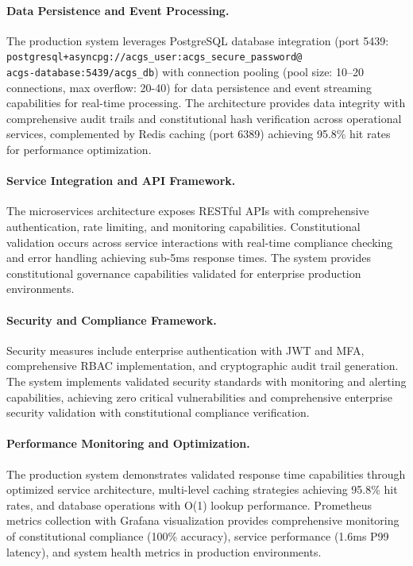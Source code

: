 \documentclass[manuscript,screen,9pt]{acmart}
\begin{document}
\paragraph{Data Persistence and Event Processing.} The production system leverages PostgreSQL database integration (port 5439: \texttt{postgresql+asyncpg://acgs\_user:acgs\_secure\_password@}\\\texttt{acgs-database:5439/acgs\_db}) with connection pooling (pool size: 10--20 connections, max overflow: 20-40) for data persistence and event streaming capabilities for real-time processing. %
The architecture provides data integrity with comprehensive audit trails and constitutional hash verification across operational services, complemented by Redis caching (port 6389) achieving 95.8\% hit rates for performance optimization.

\paragraph{Service Integration and API Framework.} The microservices architecture exposes RESTful APIs with comprehensive authentication, rate limiting, and monitoring capabilities. Constitutional validation occurs across service interactions with real-time compliance checking and error handling achieving sub-5ms response times. The system provides constitutional governance capabilities validated for enterprise production environments.

\paragraph{Security and Compliance Framework.} Security measures include enterprise authentication with JWT and MFA, comprehensive RBAC implementation, and cryptographic audit trail generation. The system implements validated security standards with monitoring and alerting capabilities, achieving zero critical vulnerabilities and comprehensive enterprise security validation with constitutional compliance verification.

\paragraph{Performance Monitoring and Optimization.} The production system demonstrates validated response time capabilities through optimized service architecture, multi-level caching strategies achieving 95.8\% hit rates, and database operations with O(1) lookup performance. Prometheus metrics collection with Grafana visualization provides comprehensive monitoring of constitutional compliance (100\% accuracy), service performance (1.6ms P99 latency), and system health metrics in production environments.
\end{document}

